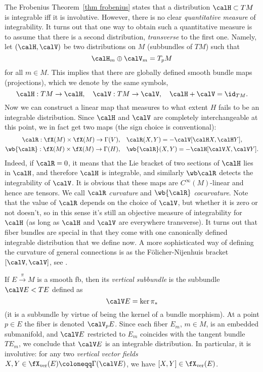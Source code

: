 The Frobenius Theorem~\ref{thm frobenius} states that a distribution $\calH\subset TM$ is integrable iff it is involutive. However, there is no clear \emph{quantitative measure} of integrability. It turns out that one way to obtain such a quantitative measure is to assume that there is a second distribution, \emph{transverse} to the first one. Namely, let $(\calH,\calV)$ be two distributions on $M$ (subbundles of $TM$) such that
\[\calH_m\oplus \calV_m=T_pM\]
for all $m\in M$. This implies that there are globally defined smooth bundle maps (projections), which we denote by the same symbols,
\[\calH:TM\to \calH,\quad \calV:TM\to \calV,\quad \calH+\calV=\id_{TM}.\]
Now we can construct a linear map that measures to what extent $H$ fails to be an integrable distribution. Since $\calH$ and $\calV$ are completely interchangeable at this point, we in fact get two maps (the sign choice is conventional):
\begin{align}
    \calR:\fX(M)\times\fX(M)\to \Gamma(V),\quad & \calR(X,Y)=-\calV[\calH X,\calH Y],\\
    \wb{\calR}:\fX(M)\times\fX(M)\to \Gamma(H),\quad & \wb{\calR}(X,Y)=-\calH[\calV X,\calV Y].
\end{align}
Indeed, if $\calR=0$, it means that the Lie bracket of two sections of $\calH$ lies in $\calH$, and therefore $\calH$ is integrable, and similarly $\wb \calR$ detects the integrability of $\calV$. It is obvious that these maps are $C^\infty(M)$-linear and hence are tensors. We call $\calR$ \emph{curvature} and $\wb{\calR}$ \emph{cocurvature}. Note that the value of $\calR$ depends on the choice of $\calV$, but whether it is zero or not doesn't, so in this sense it's still an objective measure of integrability for $\calH$ (as long as $\calH$ and $\calV$ are everywhere transverse). It turns out that fiber bundles are special in that they come with one canonically defined integrable distribution that we define now. A more sophisticated way of defining the curvature of general connections is as the F\"olicher-Nijenhuis bracket $[\calV,\calV]$, see \cite[Sec.~9]{Kolar}.

\begin{defn}
    If $E\overset{\pi}{\to}M$ is a smooth \gls{fb}, then its \emph{vertical subbundle} is the subbundle $\calV E< TE$ defined as 
    \[\calV E=\ker \pi_\ast\]
    (it is a subbundle by virtue of being the kernel of a bundle morphism). At a point $p\in E$ the fiber is denoted $\calV_pE$. Since each fiber $E_m$, $m\in M$, is an embedded submanifold, and $\calV E$ restricted to $E_m$ coincides with the tangent bundle $TE_m$, we conclude that $\calV E$ is an integrable distribution. In particular, it is involutive: for any two \emph{vertical vector fields} $X,Y\in \fX_{\mathrm{ver}}(E)\coloneqq\Gamma(\calV E)$, we have $[X,Y]\in \fX_{\mathrm{ver}}(E)$.
\end{defn}

